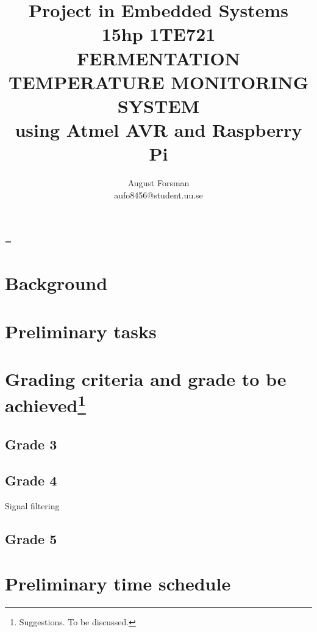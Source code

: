 \documentclass[10pt]{article}
\title{\renewcommand{\baselinestretch}{1.17}\normalsize\bf%
  Project in Embedded Systems 15hp 1TE721\\
  \vspace{2mm}
  \uppercase{Fermentation temperature monitoring system}\\
  using Atmel AVR and Raspberry Pi\\
}
\author{%
  August Forsman\\
  \small aufo8456@student.uu.se
}
\begin{document}
\date{}

\maketitle

\vspace{-0.5cm}



\baselineskip=\normalbaselineskip

\section*{Background}%
\label{sec:background}
\section*{Preliminary tasks}%
\label{sec:preliminary_tasks}
\section*{Grading criteria and grade to be achieved\protect\footnote{Suggestions. To be discussed.}}%
\label{sec:grading_criteria_and_grading_goal}
\subsection*{Grade 3}%
\label{sub:grade_3}
\subsection*{Grade 4}%
\label{sub:grade_4}
Signal filtering
\subsection*{Grade 5}%
\label{sub:grade_5}


\section*{Preliminary time schedule}%
\label{sec:preliminary_time_schedule}
\end{document}
